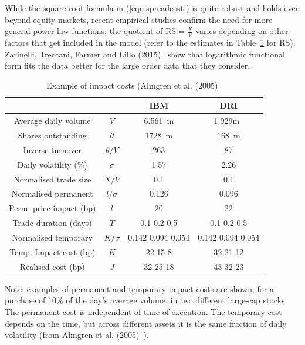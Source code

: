 While the square root formula in (\ref{eqn:spreadcost}) is quite robust and holds even beyond equity markets, recent empirical studies confirm the need for more general power law functions; the quotient of $\text{RS}=\frac{X}{V}$ varies depending on other factors that get included in the model (refer to the estimates in Table~\ref{tab:costimpact} for RS). Zarinelli, Treccani, Farmer and Lillo (2015)~\cite{zar} show that logarithmic functional form fits the data better for the large order data that they consider. 


\begin{table}[!ht]
\caption{Example of impact costs (Almgren et al. (2005)~\cite{athl} \label{tab:costimpact}}
\begin{tabular}{cccc}
 & & IBM & DRI \\ \hline
Average daily volume & $V$ & 6.561~m & 1.929m~ \\
Shares outstanding & $\theta$ & 1728~m & 168~m \\
Inverse turnover & $\theta/V$ & 263 & 87 \\
Daily volatility (\%) & $\sigma$ &1.57 & 2.26 \\
Normalised trade size & $X/V$ & 0.1 & 0.1 \\ \hline
Normalised permanent & $l/\sigma$ & 0.126 & 0.096 \\
Perm. price impact (bp) & $l$ & 20 & 22 \\ \hline
Trade duration (days) & $T$ & 0.1 \hspace{0.2cm} 0.2 \hspace{0.2cm} 0.5 & 0.1 \hspace{0.2cm}0.2 \hspace{0.2cm} 0.5\\
Normalised temporary & $K/\sigma$ & 0.142 \hspace{0.2cm} 0.094 \hspace{0.2cm}0.054 & 0.142 \hspace{0.2cm} 0.094 \hspace{0.2cm} 0.054 \\
Temp. Impact cost (bp) & $K$ & 22 \hspace{0.2cm} 15 \hspace{0.2cm} 8 & 32  \hspace{0.2cm}21\hspace{0.2cm} 12 \\ \hline
Realised cost (bp) & $J$ & 32 \hspace{0.2cm} 25 \hspace{0.2cm} 18 & 43 \hspace{0.2cm}32 \hspace{0.2cm} 23
\end{tabular}
\small Note: examples of permanent and temporary impact costs are shown, for a purchase of 10\% of the day's average volume, in two different large-cap stocks. The permanent cost is independent of time of execution. The temporary cost depends on the time, but across different assets it is the same fraction of daily volatility (from Almgren et al. (2005)~\cite{athl}). \normalsize
\end{table}



